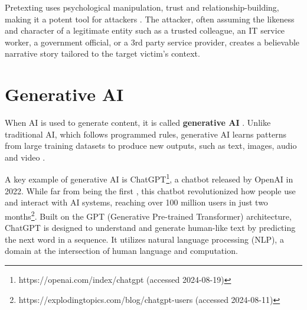 Pretexting uses psychological manipulation, trust and relationship-building, making it a potent tool for attackers \citep{mitnickArtDeceptionControlling2003}. The attacker, often assuming the likeness and character of a legitimate entity such as a trusted colleague, an IT service worker, a government official, or a 3rd party service provider, creates a believable narrative story tailored to the target victim's context.
















\section{Generative AI}
\begin{comment}

Artificial Intelligence, Generative AI (ChatGPT, etc)

What to cover:
    - Mitä tekoäly oikeastaan edes on?
    - What is Generative AI
    - OpenAI releasing ChatGPT to the public in 2022
    - NLP Natural Language Processing
    
What to skip:
    - GPT:n historian (versiot 1, 2, 3, 3.5 jne) eli keskitytään vain GPT versioon 4 ja uudempiiin
    
\end{comment}

When AI is used to generate content, it is called \textbf{generative AI} \citep{goodfellowGenerativeAdversarialNetworks2020}. Unlike traditional AI, which follows programmed rules, generative AI learns patterns from large training datasets to produce new outputs, such as text, images, audio and video \citep{fakhouriAIDrivenSolutionsForSocialEngineeringAttacks2024}.

A key example of generative AI is ChatGPT\footnote{https://openai.com/index/chatgpt (accessed 2024-08-19)}, a chatbot released by OpenAI in 2022. While far from being the first \citep{weizenbaumELIZA1996}, this chatbot revolutionized how people use and interact with AI systems, reaching over 100 million users in just two months\footnote{https://explodingtopics.com/blog/chatgpt-users (accessed 2024-08-11)}. Built on the GPT (Generative Pre-trained Transformer) architecture, ChatGPT is designed to understand and generate human-like text by predicting the next word in a sequence. It utilizes natural language processing (NLP), a domain at the intersection of human language and computation.

